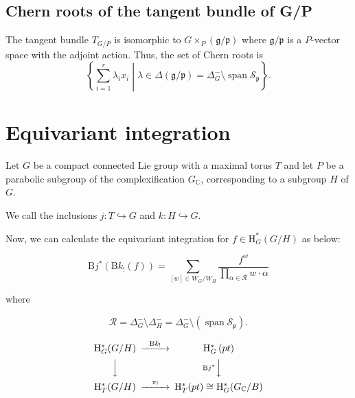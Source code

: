 \documentclass[uplatex,dvipdfmx]{jsarticle}
\begin{document}
\subsection{Chern roots of the tangent bundle of G/P}

The tangent bundle 
$T_{G/P}$
is isomorphic to
$G \times_P (\mathfrak{g}/\mathfrak{p})$
where
$\mathfrak{g}/\mathfrak{p}$
is a 
$P$-vector space 
with the adjoint action.
Thus, the set of Chern roots is
\begin{equation}
    \left\{ 
        \sum_{i = 1}^r
        \lambda_i
        x_i
        \middle|
        \lambda \in \Delta(\mathfrak{g}/\mathfrak{p})
        =
        \Delta^-_G 
        \setminus
        \operatorname{span} \mathcal{S}_\mathfrak{p}
    \right\}.
\end{equation}

\section{Equivariant integration}

Let 
$G$ 
be a compact connected Lie group with a maximal torus
$T$
and let
$P$
be a parabolic subgroup of the complexification 
$G_{\mathbb{C}}$,
corresponding to a subgroup
$H$
of
$G$.

We call the inclusions
$j \colon T \hookrightarrow G$
and
$k \colon H \hookrightarrow G$.

Now, we can calculate the equivariant integration for 
$f \in \mathrm{H}^*_G(G/H)$ 
as below:

\begin{equation}
    \mathrm{B}j^*\left( 
        \mathrm{B}k_! \left( 
            f
        \right)
    \right)
    =
    \sum_{
        [w] \in W_G / W_H
    }
    \frac{f^w}{\prod_{\alpha \in \mathcal{R}} w \cdot \alpha}
\end{equation}

where

\begin{equation}
    \mathcal{R}
    =
    \Delta_G^- \setminus \Delta_H^-
    =
    \Delta_G^- \setminus (\operatorname{span} \mathcal{S}_\mathfrak{p}).
\end{equation}

\begin{equation}
    \begin{CD}
        \mathrm{H}^*_G(G/H) @>{\mathrm{B}k_!}>> \mathrm{H}_G^*\left( pt \right) \\
        @VVV    @V{\mathrm{B}j^*}VV \\
        \mathrm{H}^*_T(G/H) @>{\pi_!}>> \mathrm{H}^*_T(pt) \cong \mathrm{H}^*_G(G_\mathbb{C}/B)
     \end{CD}
\end{equation}
\end{document}

